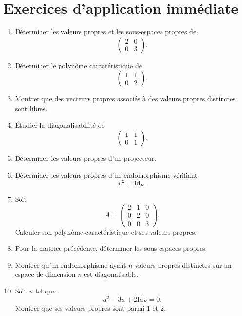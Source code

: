 \documentclass[11pt,a4paper]{article}
\theoremstyle{remark}
\newcommand{\id}{\mathrm{Id}}
\begin{document}
\section*{Exercices d’application immédiate}

\begin{enumerate}[label=\textbf{Exercice \arabic*.}]
    \item Déterminer les valeurs propres et les sous-espaces propres de
    \[
    \begin{pmatrix}
    2 & 0\\
    0 & 3
    \end{pmatrix}.
    \]

    \item Déterminer le polynôme caractéristique de
    \[
    \begin{pmatrix}
    1 & 1\\
    0 & 2
    \end{pmatrix}.
    \]

    \item Montrer que des vecteurs propres associés à des valeurs propres distinctes sont libres.

    \item Étudier la diagonalisabilité de
    \[
    \begin{pmatrix}
    1 & 1\\
    0 & 1
    \end{pmatrix}.
    \]

    \item Déterminer les valeurs propres d’un projecteur.

    \item Déterminer les valeurs propres d’un endomorphisme vérifiant
    \[
    u^2=\id_E.
    \]

    \item Soit
    \[
    A=
    \begin{pmatrix}
    2 & 1 & 0\\
    0 & 2 & 0\\
    0 & 0 & 3
    \end{pmatrix}.
    \]
    Calculer son polynôme caractéristique et ses valeurs propres.

    \item Pour la matrice précédente, déterminer les sous-espaces propres.

    \item Montrer qu’un endomorphisme ayant \(n\) valeurs propres distinctes sur un espace de dimension \(n\) est diagonalisable.

    \item Soit \(u\) tel que
    \[
    u^2-3u+2\id_E=0.
    \]
    Montrer que ses valeurs propres sont parmi \(1\) et \(2\).
\end{enumerate}
\end{document}
